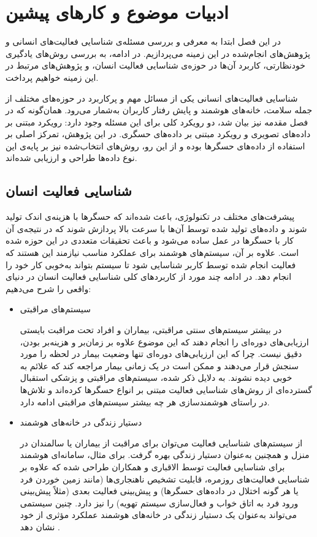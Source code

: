 \chapter{ادبیات موضوع و کارهای پیشین}
\clearpage

در این فصل ابتدا به معرفی و بررسی مسئله‌ی شناسایی فعالیت‌های انسانی و پژوهش‌های انجام‌شده در این زمینه می‌پردازیم. در ادامه، به بررسی روش‌های یادگیری خودنظارتی، کاربرد آن‌ها در حوزه‌ی شناسایی فعالیت انسان، و پژوهش‌های مرتبط در این زمینه خواهیم پرداخت.

شناسایی فعالیت‌های انسانی یکی از مسائل مهم و پرکاربرد در حوزه‌های مختلف از جمله سلامت، خانه‌های هوشمند و پایش رفتار کاربران به‌شمار می‌رود. همان‌گونه که در فصل مقدمه نیز بیان شد، دو رویکرد کلی برای این مسئله وجود دارد: رویکرد مبتنی بر داده‌های تصویری و رویکرد مبتنی بر داده‌های حسگری. در این پژوهش، تمرکز اصلی بر استفاده از داده‌های حسگرها بوده و از این رو، روش‌های انتخاب‌شده نیز بر پایه‌ی این نوع داده‌ها طراحی و ارزیابی شده‌اند.

\section{شناسایی فعالیت انسان}

پیشرفت‌های مختلف در تکنولوژی، باعث شده‌اند که حسگرها با هزینه‌ی اندک تولید شوند و داده‌های تولید شده توسط آن‌ها با سرعت بالا پردازش شوند که در نتیجه‌ی آن کار با حسگرها در عمل ساده می‌شود و باعث تحقیقات متعددی در این حوزه شده است. علاوه بر آن، سیستم‌های هوشمند برای عملکرد مناسب نیازمند این هستند که فعالیت انجام شده توسط کاربر شناسایی شود تا سیستم بتواند به‌خوبی کار خود را انجام دهد. در ادامه چند مورد از کاربردهای کلی شناسایی فعالیت انسان در دنیای واقعی را شرح می‌دهیم:

\begin{itemize}
\item{سیستم‌های مراقبتی}

در بیشتر سیستم‌های سنتی مراقبتی، بیماران و افراد تحت مراقبت بایستی ارزیابی‌های دوره‌ای را انجام دهند که این موضوع علاوه بر زمان‌بر و هزینه‌بر بودن، دقیق نیست. چرا که این ارزیابی‌های دوره‌ای تنها وضعیت بیمار در لحظه را مورد سنجش قرار می‌دهند و ممکن است در یک زمانی بیمار مراجعه کند که علائم به خوبی دیده نشوند. به دلایل ذکر شده، سیستم‌های مراقبتی و پزشکی استقبال گسترده‌ای از روش‌های شناسایی فعالیت مبتنی بر انواع حسگرها کرده‌اند و تلاش‌ها در راستای هوشمندسازی هر چه بیشتر سیستم‌های مراقبتی ادامه دارد.

\item{دستیار زندگی در خانه‌های هوشمند}

از سیستم‌های شناسایی فعالیت می‌توان برای مراقبت از بیماران یا سالمندان در منزل و همچنین به‌عنوان دستیار زندگی بهره گرفت. برای مثال، سامانه‌ای هوشمند برای شناسایی فعالیت توسط الاقباری و همکاران طراحی شده که علاوه بر شناسایی فعالیت‌های روزمره، قابلیت تشخیص ناهنجاری‌ها (مانند زمین خوردن فرد یا هر گونه اختلال در داده‌های حسگرها) و پیش‌بینی فعالیت بعدی (مثلاً پیش‌بینی ورود فرد به اتاق خواب و فعال‌سازی سیستم تهویه) را نیز دارد. چنین سیستمی می‌تواند به‌عنوان یک دستیار زندگی در خانه‌های هوشمند عملکرد مؤثری از خود نشان دهد \cite{alaghbari2022activities}.
‪
\end{itemize}

